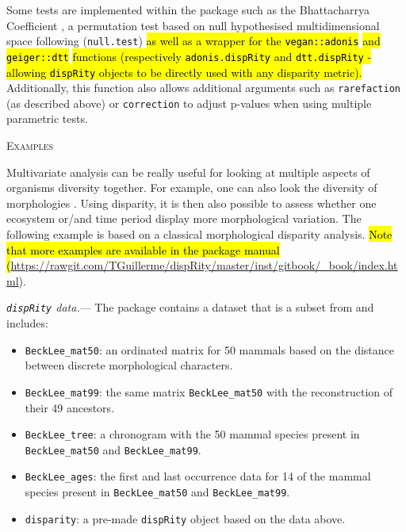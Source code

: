 \documentclass[12pt,letterpaper]{article}
\renewcommand{\section}[1]{%
\bigskip
\begin{center}
\begin{Large}
\normalfont\scshape #1
\medskip
\end{Large}
\end{center}}
\renewcommand{\subsubsection}[1]{%
\vspace{2ex}
\noindent
\textit{#1.}---}
\newcommand{\disp}{\texttt{dispRity} }
\begin{document}
Some tests are implemented within the package such as the Bhattacharrya Coefficient \citep[\texttt{bhatt.coeff};][]{Bhattacharyya,GuillermeCooper}, a permutation test based on null hypothesised multidimensional space following \cite{diaz2016global} (\texttt{null.test}) 
\hl{as well as a wrapper for the \texttt{vegan::adonis}}
 \citep{oksanen2007vegan}
\hl{and \texttt{geiger::dtt}}
 \citep{geiger2008}
\hl{functions (respectively \texttt{adonis.dispRity} and \texttt{dtt.dispRity} - allowing \texttt{dispRity} objects to be directly used with any disparity metric).}
Additionally, this function also allows additional arguments such as \texttt{rarefaction} (as described above) or \texttt{correction} to adjust p-values when using multiple parametric tests.

\section{Examples}
Multivariate analysis can be really useful for looking at multiple aspects of organisms diversity together.
For example, one can also look the diversity of morphologies \citep[or disparity;][]{foote1991morphological}.
Using disparity, it is then also possible to assess whether one ecosystem or/and time period display more morphological variation.
The following example is based on a classical morphological disparity analysis.
\hl{Note that more examples are available in the package manual (}\url{https://rawgit.com/TGuillerme/dispRity/master/inst/gitbook/_book/index.html}).

\subsubsection{\disp data}
The package contains a dataset that is a subset from \cite{beckancient2014} and includes:

\begin{itemize}
    \item \texttt{BeckLee\_mat50}: an ordinated matrix for 50 mammals based on the distance between discrete morphological characters.
    \item \texttt{BeckLee\_mat99}: the same matrix \texttt{BeckLee\_mat50} with the reconstruction of their 49 ancestors.
    \item \texttt{BeckLee\_tree}: a chronogram with the 50 mammal species present in \texttt{BeckLee\_mat50} and \texttt{BeckLee\_mat99}.
    \item \texttt{BeckLee\_ages}: the first and last occurrence data for 14 of the mammal species present in \texttt{BeckLee\_mat50} and \texttt{BeckLee\_mat99}.
    \item \texttt{disparity}: a pre-made \disp object based on the data above.
\end{itemize}
\end{document}
